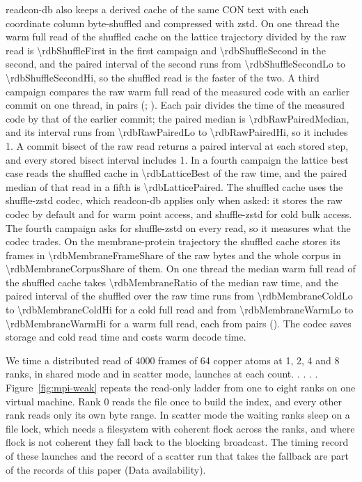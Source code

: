 \documentclass[preprint,12pt]{elsarticle}
\begin{document}
readcon-db also keeps a derived cache of the same CON text with each coordinate column byte-shuffled and compressed with zstd.
On one thread the warm full read of the shuffled cache on the lattice trajectory divided by the raw read is \num{\rdbShuffleFirst} in the first campaign and \num{\rdbShuffleSecond} in the second, and the paired interval of the second runs from \num{\rdbShuffleSecondLo} to \num{\rdbShuffleSecondHi}, so the shuffled read is the faster of the two.
A third campaign compares the raw warm full read of the measured code with an earlier commit on one thread, in \rdbRawPairs{} pairs (\rdbRawPairedCIMethod; \rdbRawPairOrder).
Each pair divides the time of the measured code by that of the earlier commit; the paired median is \num{\rdbRawPairedMedian}, and its interval runs from \num{\rdbRawPairedLo} to \num{\rdbRawPairedHi}, so it includes 1.
A commit bisect of the raw read returns a paired interval at each stored step, and every stored bisect interval includes 1.
In a fourth campaign the lattice best case reads the shuffled cache in \num{\rdbLatticeBest} of the raw time, and the paired median of that read in a fifth is \num{\rdbLatticePaired}.
The shuffled cache uses the shuffle-zstd codec, which readcon-db applies only when asked: it stores the raw codec by default and for warm point access, and shuffle-zstd for cold bulk access.
The fourth campaign asks for shuffle-zstd on every read, so it measures what the codec trades.
On the membrane-protein trajectory the shuffled cache stores its frames in \num{\rdbMembraneFrameShare} of the raw bytes and the whole corpus in \num{\rdbMembraneCorpusShare} of them.
On one thread the median warm full read of the shuffled cache takes \num{\rdbMembraneRatio} of the median raw time, and the paired interval of the shuffled over the raw time runs from \num{\rdbMembraneColdLo} to \num{\rdbMembraneColdHi} for a cold full read and from \num{\rdbMembraneWarmLo} to \num{\rdbMembraneWarmHi} for a warm full read, each from \rdbMembranePairs{} pairs (\rdbMembraneCIMethod).
The codec saves storage and cold read time and costs warm decode time.



We time a distributed read of 4000 frames of 64 copper atoms at 1, 2, 4 and 8 ranks, in shared mode and in scatter mode, \mpiRepeats{} launches at each count.
\mpiSharedLine.
\mpiScatterLine.
\mpiCompareLine.
\mpiScatterIqrLine.
Figure~\ref{fig:mpi-weak} repeats the read-only ladder from one to eight ranks on one virtual machine.
Rank 0 reads the file once to build the index, and every other rank reads only its own byte range.
In scatter mode the waiting ranks sleep on a file lock, which needs a filesystem with coherent flock across the ranks, and where flock is not coherent they fall back to the blocking broadcast.
The timing record of these launches and the record of a scatter run that takes the fallback are part of the records of this paper (Data availability).
\end{document}
